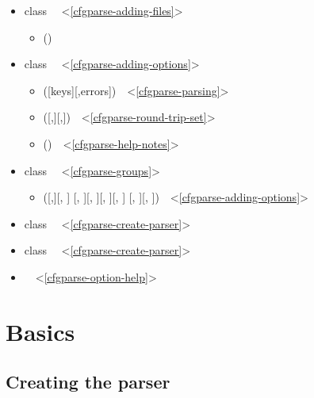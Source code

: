 \documentclass{howto}
\begin{document}
\begin{itemize}
\item class ~~<\ref{cfgparse-adding-files}>
    \begin{itemize} 
    \item {}()
    \end{itemize}
    
\item class ~~<\ref{cfgparse-adding-options}>
    \begin{itemize} 
    \item {}([keys][,errors])~~<\ref{cfgparse-parsing}>
    \item {}([,][,])~~<\ref{cfgparse-round-trip-set}>
    \item {}()~~<\ref{cfgparse-help-notes}>
    \end{itemize}
    
\item class ~~<\ref{cfgparse-groups}>
    \begin{itemize} 
    \item {}([,][, ]
        [, ][, ][, ][, ]
        [, ][, ])~~<\ref{cfgparse-adding-options}>
    \end{itemize}

\item class ~~<\ref{cfgparse-create-parser}>
\item class ~~<\ref{cfgparse-create-parser}>
\item {}~~<\ref{cfgparse-option-help}>
\end{itemize}
            
\section{Basics}

\subsection{Creating the parser\label{cfgparse-create-parser}}
\end{document}
